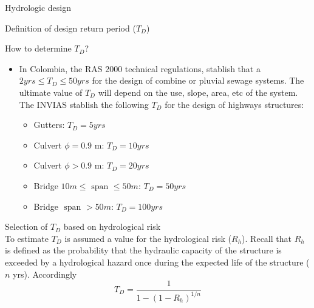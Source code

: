 \documentclass[8pt]{beamer}
\renewcommand{\emph}[1]{\textcolor{myorange}{#1}}
\begin{document}
\begin{frame}{Hydrologic design}
   \begin{block}{Definition of design return period ($T_D$)}
   \end{block}
    \alert{How to determine $T_D$?}\\
   
    \begin{itemize}
        \item In Colombia, the \alert{RAS 2000} technical regulations, stablish that a $2  yrs \leq T_D \leq 50 yrs$ for the design of \emph{combine or pluvial sewage systems}. The ultimate value of $T_D$ will depend on the \emph{use},  \emph{slope}, area, etc of the system. The \alert{INVIAS} stablish the following $T_D$ for the design of highways structures:
                      \begin{itemize}
                          \item \emph{Gutters}: $T_D = 5 yrs$
                          \item \emph{Culvert $\phi = 0.9$ m}: $T_D = 10 yrs$
                          \item \emph{Culvert $\phi > 0.9$ m}: $T_D = 20 yrs$
                          \item \emph{Bridge $10 m \leq \text{ span } \leq 50 m$}: $T_D = 50 yrs$
                          \item \emph{Bridge $\text{ span } > 50 m$}: $T_D = 100 yrs$
    \end{itemize}
    \end{itemize}
 
    \alert{Selection of $T_D$ based on hydrological risk}\\
         To estimate $T_D$ is assumed a value for the \alert{hydrological risk ($R_h$)}. Recall that $R_h$ is defined as the probability that the hydraulic capacity of the structure is exceeded by a hydrological hazard once during the expected life of the structure ($n$ yrs). Accordingly
            \[
                T_D = \frac{1}{1- (1-R_h)^{1/n}}
            \]

\end{frame}
\end{document}

